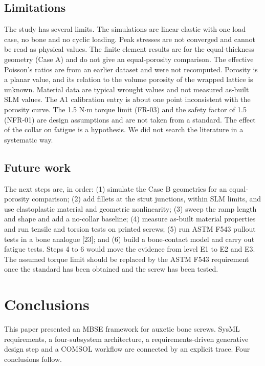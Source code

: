 \documentclass[10pt,twocolumn,letterpaper]{article}
\begin{document}
\subsection{Limitations}
The study has several limits. The simulations are linear elastic with one load case, no bone and no cyclic loading. Peak stresses are not converged and cannot be read as physical values. The finite element results are for the equal-thickness geometry (Case A) and do not give an equal-porosity comparison. The effective Poisson's ratios are from an earlier dataset and were not recomputed. Porosity is a planar value, and its relation to the volume porosity of the wrapped lattice is unknown. Material data are typical wrought values and not measured as-built SLM values. The A1 calibration entry is about one point inconsistent with the porosity curve. The 1.5 N$\cdot$m torque limit (FR-03) and the safety factor of 1.5 (NFR-01) are design assumptions and are not taken from a standard. The effect of the collar on fatigue is a hypothesis. We did not search the literature in a systematic way.

\subsection{Future work}
The next steps are, in order: (1) simulate the Case B geometries for an equal-porosity comparison; (2) add fillets at the strut junctions, within SLM limits, and use elastoplastic material and geometric nonlinearity; (3) sweep the ramp length and shape and add a no-collar baseline; (4) measure as-built material properties and run tensile and torsion tests on printed screws; (5) run ASTM F543 pullout tests in a bone analogue [23]; and (6) build a bone-contact model and carry out fatigue tests. Steps 4 to 6 would move the evidence from level E1 to E2 and E3. The assumed torque limit should be replaced by the ASTM F543 requirement once the standard has been obtained and the screw has been tested.


\section{Conclusions}
This paper presented an MBSE framework for auxetic bone screws. SysML requirements, a four-subsystem architecture, a requirements-driven generative design step and a COMSOL workflow are connected by an explicit trace. Four conclusions follow.
\end{document}
